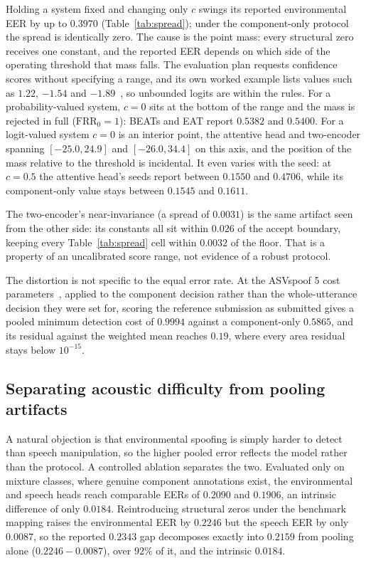 \documentclass{article}
\begin{document}
Holding a system fixed and changing only $c$ swings its reported environmental EER by up to $0.3970$ (Table~\ref{tab:spread}); under the component-only protocol the spread is identically zero. The cause is the point mass: every structural zero receives one constant, and the reported EER depends on which side of the operating threshold that mass falls. The evaluation plan requests confidence scores without specifying a range, and its own worked example lists values such as $1.22$, $-1.54$ and $-1.89$~\cite{esdd2plan}, so unbounded logits are within the rules. For a probability-valued system, $c=0$ sits at the bottom of the range and the mass is rejected in full ($\mathrm{FRR}_0=1$): BEATs and EAT report $0.5382$ and $0.5400$. For a logit-valued system $c=0$ is an interior point, the attentive head and two-encoder spanning $[-25.0, 24.9]$ and $[-26.0, 34.4]$ on this axis, and the position of the mass relative to the threshold is incidental. It even varies with the seed: at $c=0.5$ the attentive head's seeds report between $0.1550$ and $0.4706$, while its component-only value stays between $0.1545$ and $0.1611$.

The two-encoder's near-invariance (a spread of $0.0031$) is the same artifact seen from the other side: its constants all sit within $0.026$ of the accept boundary, keeping every Table~\ref{tab:spread} cell within $0.0032$ of the floor. That is a property of an uncalibrated score range, not evidence of a robust protocol.

The distortion is not specific to the equal error rate. At the ASVspoof 5 cost
parameters~\cite{asvspoof5}, applied to the component decision rather than the whole-utterance
decision they were set for, scoring the reference submission as submitted gives a pooled minimum
detection cost of $0.9994$ against a component-only $0.5865$, and its residual against the weighted mean reaches $0.19$, where every
area residual stays below $10^{-15}$.

\subsection{Separating acoustic difficulty from pooling artifacts}
\label{sec:acoustic_vs_pooling}

A natural objection is that environmental spoofing is simply harder to detect than speech manipulation, so the higher pooled error reflects the model rather than the protocol. A controlled ablation separates the two. Evaluated only on mixture classes, where genuine component annotations exist, the environmental and speech heads reach comparable EERs of $0.2090$ and $0.1906$, an intrinsic difference of only $0.0184$. Reintroducing structural zeros under the benchmark mapping raises the environmental EER by $0.2246$ but the speech EER by only $0.0087$, so the reported $0.2343$ gap decomposes exactly into $0.2159$ from pooling alone ($0.2246 - 0.0087$), over $92\%$ of it, and the intrinsic $0.0184$.
\end{document}
